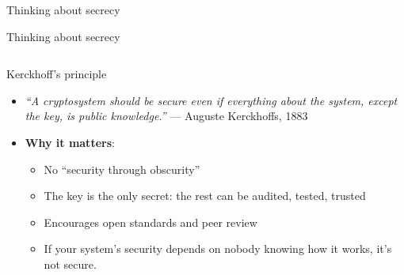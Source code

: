 \documentclass[aspectratio=169, lualatex, handout]{beamer}
\begin{document}
\begin{frame}{Thinking about secrecy}
\end{frame}

\begin{frame}{Thinking about secrecy}
	\begin{columns}[c]
	\end{columns}
\end{frame}

\begin{frame}{Kerckhoff's principle}
	\begin{itemize}[<+->]
		\item \textit{``A cryptosystem should be secure even if everything about the system, except the key, is public knowledge.''} — Auguste Kerckhoffs, 1883
		\item \textbf{Why it matters}:
		      \begin{itemize}[<+->]
			      \item No ``security through obscurity''
			      \item The key is the only secret: the rest can be audited, tested, trusted
			      \item Encourages open standards and peer review
			      \item If your system's security depends on nobody knowing how it works, it's not secure.
		      \end{itemize}
	\end{itemize}
\end{frame}
\end{document}
